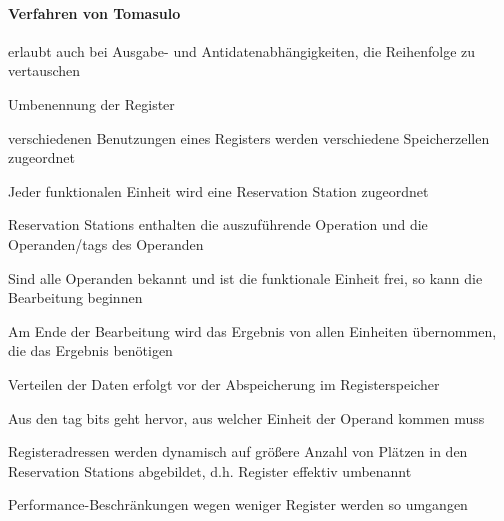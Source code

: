 \documentclass[10pt,landscape]{article}
\begin{document}
\begin{multicols}{3}
  
  \paragraph{ Verfahren von Tomasulo}
  \begin{itemize*}
    \item erlaubt auch bei Ausgabe- und Antidatenabhängigkeiten, die Reihenfolge zu vertauschen
    \item Umbenennung der Register
    \item verschiedenen Benutzungen eines Registers werden verschiedene Speicherzellen zugeordnet
    \item Jeder funktionalen Einheit wird eine Reservation Station zugeordnet
    \item Reservation Stations enthalten die auszuführende Operation und die Operanden/tags des Operanden
    \item Sind alle Operanden bekannt und ist die funktionale Einheit frei, so kann die Bearbeitung beginnen
    \item Am Ende der Bearbeitung wird das Ergebnis von allen Einheiten übernommen, die das Ergebnis benötigen
    \item Verteilen der Daten erfolgt vor der Abspeicherung im Registerspeicher
    \item Aus den tag bits geht hervor, aus welcher Einheit der Operand kommen muss
    \item Registeradressen werden dynamisch auf größere Anzahl von Plätzen in den Reservation Stations abgebildet, d.h. Register effektiv umbenannt
    \item Performance-Beschränkungen wegen weniger Register werden so umgangen
  \end{itemize*}
  

\end{multicols}
\end{document}
